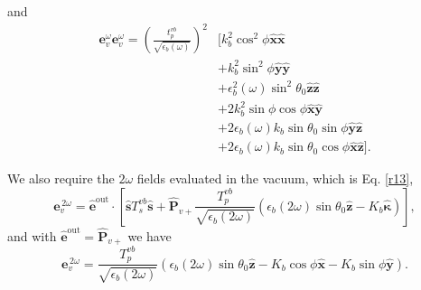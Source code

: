 and
\begin{equation*}
\begin{split}
\mathbf{e}^{\omega}_{v}\mathbf{e}^{\omega}_{v} =
\left(\frac{t^{v b}_{p}}{\sqrt{\epsilon_{b}(\omega)}}\right)^{2}
&\big[
   k^{2}_{b}\cos^{2}\phi\hat{\mathbf{x}}\hat{\mathbf{x}}\\
&+ k^{2}_{b}\sin^{2}\phi\hat{\mathbf{y}}\hat{\mathbf{y}}\\
&+ \epsilon^{2}_{b}(\omega)\sin^{2}\theta_{0}
   \hat{\mathbf{z}}\hat{\mathbf{z}}\\
&+ 2k^{2}_{b}\sin\phi\cos\phi\hat{\mathbf{x}}\hat{\mathbf{y}}\\
&+ 2\epsilon_{b}(\omega)k_{b}\sin\theta_{0}\sin\phi
   \hat{\mathbf{y}}\hat{\mathbf{z}}\\
&+ 2\epsilon_{b}(\omega)k_{b}\sin\theta_{0}\cos\phi
   \hat{\mathbf{x}}\hat{\mathbf{z}}
\big].
\end{split}
\end{equation*}

We also require the $2\omega$ fields evaluated in the vacuum, which is Eq.
\eqref{r13},
\begin{equation}
\mathbf{e}^{\,2\omega}_{v} = \hat{\mathbf{e}}^{\mathrm{out}}
\cdot\left[
\hat{\mathbf{s}}T_s^{v b}\hat{\mathbf{s}} + \hat{\mathbf{P}}_{v+}
\frac{T^{v b}_{p}}{\sqrt{\epsilon_{b}(2\omega)}}
\left(
  \epsilon_{b}(2\omega)\sin\theta_{0}\hat{\mathbf{z}}
  - K_{b}\hat{\boldsymbol{\kappa}}
\right) 
\right],
\end{equation}
and with $\hat{\mathbf{e}}^{\mathrm{out}} = \hat{\mathbf{P}}_{v+}$ we have
\begin{equation}
\mathbf{e}^{\,2\omega}_{v} =
\frac{T^{v b}_{p}}{\sqrt{\epsilon_{b}(2\omega)}}
\left(
\epsilon_{b}(2\omega)\sin\theta_{0}\hat{\mathbf{z}}
- K_{b}\cos\phi\hat{\mathbf{x}}
- K_{b}\sin\phi\hat{\mathbf{y}}
\right).
\end{equation}

